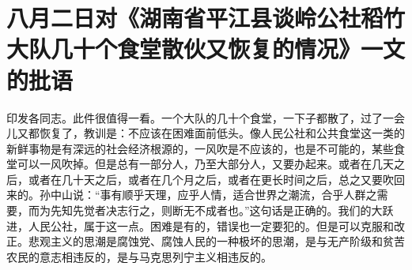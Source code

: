 \section[八月二日对《湖南省平江县谈岭公社稻竹大队几十个食堂散伙又恢复的情况》一文的批语（一九五九年八月五日）]{八月二日对《湖南省平江县谈岭公社稻竹大队几十个食堂散伙又恢复的情况》一文的批语}


印发各同志。此件很值得一看。一个大队的几十个食堂，一下子都散了，过了一会儿又都恢复了，教训是：不应该在困难面前低头。像人民公社和公共食堂这一类的新鲜事物是有深远的社会经济根源的，一风吹是不应该的，也是不可能的，某些食堂可以一风吹掉。但是总有一部分人，乃至大部分人，又要办起来。或者在几天之后，或者在几十天之后，或者在几个月之后，或者在更长时间之后，总之又要吹回来的。孙中山说：“事有顺乎天理，应乎人情，适合世界之潮流，合乎人群之需要，而为先知先觉者决志行之，则断无不成者也。”这句话是正确的。我们的大跃进，人民公社，属于这一点。困难是有的，错误也一定要犯的。但是可以克服和改正。悲观主义的思潮是腐蚀党、腐蚀人民的一种极坏的思潮，是与无产阶级和贫苦农民的意志相违反的，是与马克思列宁主义相违反的。


